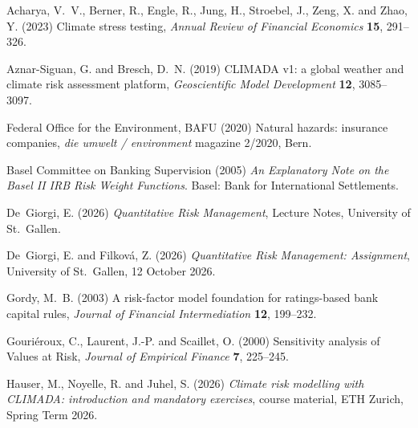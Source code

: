 
\begin{thebibliography}{}

Acharya, V.~V., Berner, R., Engle, R., Jung, H., Stroebel, J., Zeng, X. and Zhao, Y. (2023)
Climate stress testing,
\textit{Annual Review of Financial Economics} \textbf{15}, 291--326.

Aznar-Siguan, G. and Bresch, D.~N. (2019)
CLIMADA v1: a global weather and climate risk assessment platform,
\textit{Geoscientific Model Development} \textbf{12}, 3085--3097.

Federal Office for the Environment, BAFU (2020)
Natural hazards: insurance companies,
\textit{die umwelt / environment} magazine 2/2020, Bern.

Basel Committee on Banking Supervision (2005)
\textit{An Explanatory Note on the Basel II IRB Risk Weight Functions}.
Basel: Bank for International Settlements.

De~Giorgi, E. (2026)
\textit{Quantitative Risk Management}, Lecture Notes,
University of St.~Gallen.

De~Giorgi, E. and Filkov\'a, Z. (2026)
\textit{Quantitative Risk Management: Assignment},
University of St.~Gallen, 12 October 2026.

Gordy, M.~B. (2003)
A risk-factor model foundation for ratings-based bank capital rules,
\textit{Journal of Financial Intermediation} \textbf{12}, 199--232.

Gouri\'eroux, C., Laurent, J.-P. and Scaillet, O. (2000)
Sensitivity analysis of Values at Risk,
\textit{Journal of Empirical Finance} \textbf{7}, 225--245.

Hauser, M., Noyelle, R. and Juhel, S. (2026)
\textit{Climate risk modelling with CLIMADA: introduction and mandatory exercises},
course material, ETH Zurich, Spring Term 2026.


\end{thebibliography}
